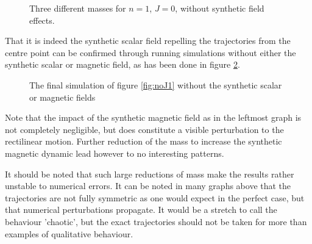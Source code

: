 \documentclass[main.tex]{subfiles}
\begin{document}
\begin{figure}[h]
    \centering
    \qquad
    \qquad
    \caption{\centering Three different masses for \(n = 1\), \(J = 0\), without synthetic field
    effects.}%
    \label{fig:noJ2}
\end{figure}

That it is indeed the synthetic scalar field repelling the trajectories from the
centre point can be confirmed through running simulations without either the synthetic
scalar or magnetic field, as has been done in figure \ref{fig:noJ3}.

\begin{figure}[h]
    \centering
    \qquad
    \caption{\centering The final simulation of figure \ref{fig:noJ1} without the synthetic scalar or
    magnetic fields}%
    \label{fig:noJ3}
\end{figure}
Note that the impact of the synthetic magnetic field as in the leftmost graph is not
completely negligible, but does constitute a visible perturbation to the rectilinear
motion. Further reduction of the mass to increase the synthetic magnetic dynamic lead
however to no interesting patterns.

It should be noted that such large reductions of mass make the
results rather unstable to numerical errors. It can be noted in many graphs above that the
trajectories are not fully symmetric as one would expect in the perfect case, but that
numerical perturbations propagate. It would be a stretch to call the behaviour 'chaotic',
but the exact trajectories should not be taken for more than examples of qualitative
behaviour.
\end{document}
